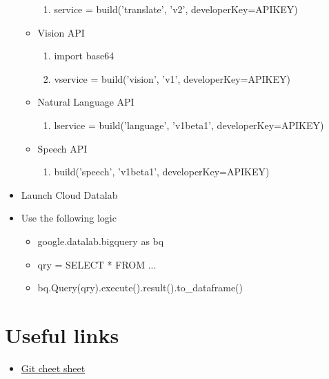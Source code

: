 \documentclass[12pt]{article}
\begin{document}
\begin{itemize}
\begin{itemize}
\begin{enumerate}
    \item service = build('translate', 'v2', developerKey=APIKEY)
  \end{enumerate}
  \item Vision API
  \begin{enumerate}
    \item import base64
    \item vservice = build('vision', 'v1', developerKey=APIKEY)
  \end{enumerate}
  \item Natural Language API
  \begin{enumerate}
    \item lservice = build('language', 'v1beta1', developerKey=APIKEY)
  \end{enumerate}
  \item Speech API
  \begin{enumerate}
    \item build('speech', 'v1beta1', developerKey=APIKEY)
  \end{enumerate}
\end{itemize}

  \item Launch Cloud Datalab
  \item Use the following logic
  \begin{itemize}
    \item google.datalab.bigquery as bq
    \item qry = \textsc{}\textsc{}\textsc{} SELECT * FROM ...\textsc{}\textsc{}\textsc{}
    \item bq.Query(qry).execute().result().to\_dataframe()
  \end{itemize}

\end{itemize}


\section{Useful links}

\begin{itemize}
\item\href{https://services.github.com/on-demand/downloads/github-git-cheat-sheet.pdf}{Git cheet sheet}
\end{itemize}
\end{document}
